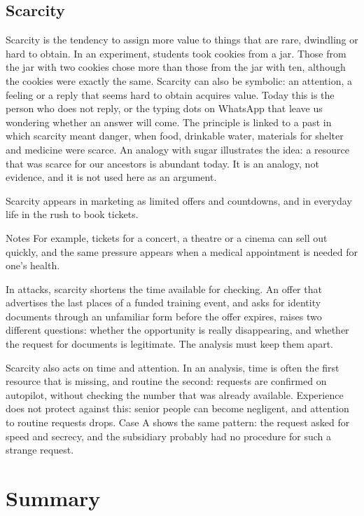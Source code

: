 \subsection{Scarcity}
Scarcity is the tendency to assign more value to things that are rare, dwindling or hard to obtain. In an experiment, students took cookies from a jar. Those from the jar with two cookies chose more than those from the jar with ten, although the cookies were exactly the same. Scarcity can also be symbolic: an attention, a feeling or a reply that seems hard to obtain acquires value. Today this is the person who does not reply, or the typing dots on WhatsApp that leave us wondering whether an answer will come. The principle is linked to a past in which scarcity meant danger, when food, drinkable water, materials for shelter and medicine were scarce. An analogy with sugar illustrates the idea: a resource that was scarce for our ancestors is abundant today. It is an analogy, not evidence, and it is not used here as an argument.

Scarcity appears in marketing as limited offers and countdowns, and in everyday life in the rush to book tickets.

\begin{nota}{Notes}
	For example, tickets for a concert, a theatre or a cinema can sell out quickly, and the same pressure appears when a medical appointment is needed for one's health.
\end{nota}

In attacks, scarcity shortens the time available for checking. An offer that advertises the last places of a funded training event, and asks for identity documents through an unfamiliar form before the offer expires, raises two different questions: whether the opportunity is really disappearing, and whether the request for documents is legitimate. The analysis must keep them apart.

Scarcity also acts on time and attention. In an analysis, time is often the first resource that is missing, and routine the second: requests are confirmed on autopilot, without checking the number that was already available. Experience does not protect against this: senior people can become negligent, and attention to routine requests drops. Case A shows the same pattern: the request asked for speed and secrecy, and the subsidiary probably had no procedure for such a strange request.

\clearpage

\section{Summary}

